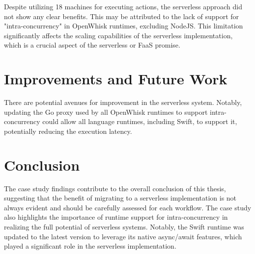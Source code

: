 Despite utilizing 18 machines for executing actions, the serverless approach did not show any clear benefits. This may be attributed to the lack of support for "intra-concurrency" in OpenWhisk runtimes, excluding NodeJS. This limitation significantly affects the scaling capabilities of the serverless implementation, which is a crucial aspect of the serverless or FaaS promise.

\section{Improvements and Future Work}

There are potential avenues for improvement in the serverless system. Notably, updating the Go proxy used by all OpenWhisk runtimes to support intra-concurrency could allow all language runtimes, including Swift, to support it, potentially reducing the execution latency. 

\section{Conclusion}

The case study findings contribute to the overall conclusion of this thesis, suggesting that the benefit of migrating to a serverless implementation is not always evident and should be carefully assessed for each workflow. The case study also highlights the importance of runtime support for intra-concurrency in realizing the full potential of serverless systems. Notably, the Swift runtime was updated to the latest version to leverage its native async/await features, which played a significant role in the serverless implementation.


